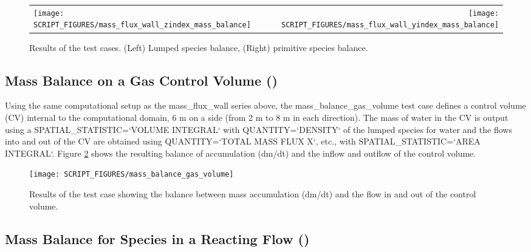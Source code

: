\documentclass[11pt]{book}
\begin{document}
\begin{figure}[ht]
\begin{tabular*}{\textwidth}{lr}
\texttt{[image: SCRIPT\_FIGURES/mass\_flux\_wall\_zindex\_mass\_balance]} &
\texttt{[image: SCRIPT\_FIGURES/mass\_flux\_wall\_yindex\_mass\_balance]}
\end{tabular*}
\caption[The  test cases]{Results of the  test cases.  (Left) Lumped species balance, (Right) primitive species balance.}
\label{fig:H2O_mass_balance}
\end{figure}

\subsection{Mass Balance on a Gas Control Volume (\texorpdfstring{}{mass\_balance\_gas\_volume})}
\label{mass_balance_gas_volume}

Using the same computational setup as the {\ct mass\_flux\_wall} series above, the {\ct mass\_balance\_gas\_volume} test case defines a control volume (CV) internal to the computational domain, 6 m on a side (from 2 m to 8 m in each direction).  The mass of water in the CV is output using a {\ct SPATIAL\_STATISTIC=`VOLUME INTEGRAL`} with {\ct QUANTITY=`DENSITY`} of the lumped species for water and the flows into and out of the CV are obtained using {\ct QUANTITY=`TOTAL MASS FLUX X`}, etc., with {\ct SPATIAL\_STATISTIC=`AREA INTEGRAL`}. Figure \ref{fig:mass_balance_gas_volume} shows the resulting balance of accumulation (dm/dt) and the inflow and outflow of the control volume.

\begin{figure}[ht]
\centering
\texttt{[image: SCRIPT\_FIGURES/mass\_balance\_gas\_volume]}
\caption[The  test case]{Results of the  test case showing the balance between mass accumulation (dm/dt) and the flow in and out of the control volume.}
\label{fig:mass_balance_gas_volume}
\end{figure}

\subsection{Mass Balance for Species in a Reacting Flow (\texorpdfstring{}{mass\_balance\_reac})}
\label{mass_balance_reac}
\end{document}
